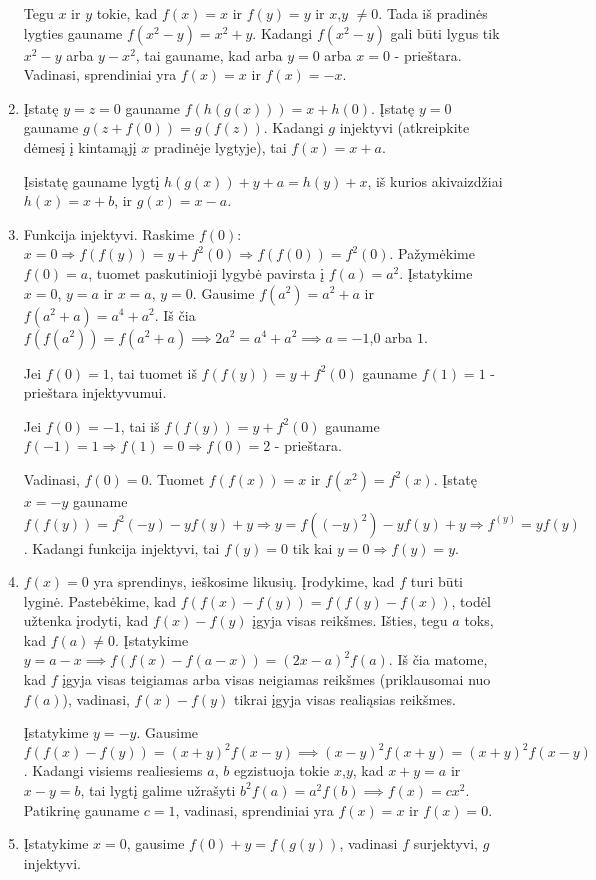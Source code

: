 \begin{enumerate}
Tegu $x$ ir $y$ tokie, kad $f(x)=x$ ir $f(y)=y$ ir $x$,$y$ $\neq 0$.
Tada iš pradinės lygties gauname $f(x^2 - y) = x^2 + y$. Kadangi
$f(x^2 - y)$ gali būti lygus tik $x^2 -y$ arba $y-x^2$, tai gauname,
kad arba $y=0$ arba $x=0$ - prieštara. Vadinasi, sprendiniai yra
$f(x)=x$ ir $f(x)=-x$.
\item 
Įstatę $y=z=0$ gauname $f(h(g(x)))=x+h(0)$. Įstatę $y=0$ gauname
$g(z+f(0))=g(f(z))$. Kadangi $g$ injektyvi (atkreipkite dėmesį į
kintamąjį $x$ pradinėje lygtyje), tai $f(x)=x+a$.

Įsistatę gauname lygtį $h(g(x)) + y + a = h(y) + x$, iš kurios
akivaizdžiai $h(x)=x+b$, ir $g(x)=x-a$.
\item 
Funkcija injektyvi. Raskime $f(0)$: $x=0 \Rightarrow f(f(y))=y +
f^2(0) \Rightarrow f(f(0))=f^2(0)$. Pažymėkime $f(0)=a$, tuomet
paskutinioji lygybė pavirsta į $f(a)=a^2$. Įstatykime $x=0$, $y=a$ ir
$x=a$, $y=0$. Gausime $f(a^2)=a^2+a$ ir $f(a^2+a)=a^4+a^2$. Iš čia
$f(f(a^2))=f(a^2+a)\implies 2a^2 = a^4 + a^2 \implies a=-1$,$0$
arba $1$.

Jei $f(0)=1$, tai tuomet iš $f(f(y))=y + f^2(0)$ gauname $f(1)=1$ -
prieštara injektyvumui.

Jei $f(0)=-1$, tai iš $f(f(y))=y + f^2(0)$ gauname $f(-1)=1
\Rightarrow f(1)=0 \Rightarrow f(0)=2$ - prieštara.

Vadinasi, $f(0)=0$. Tuomet $f(f(x))=x$ ir $f(x^2)=f^2(x)$. Įstatę
$x=-y$ gauname $f(f(y))=f^2(-y) -yf(y) + y \Rightarrow y = f((-y)^2) -
yf(y) + y\Rightarrow f^(y)=yf(y)$. Kadangi funkcija injektyvi, tai
$f(y)=0$ tik kai $y=0 \Rightarrow f(y)=y$.
\item 
$f(x)=0$ yra sprendinys, ieškosime likusių. Įrodykime, kad $f$ turi
būti lyginė. Pastebėkime, kad $f(f(x)-f(y))=f(f(y)-f(x))$, todėl
užtenka įrodyti, kad $f(x)-f(y)$ įgyja visas reikšmes. Išties, tegu
$a$ toks, kad $f(a)\neq 0$. Įstatykime $y= a-x \implies
f(f(x)-f(a-x))=(2x-a)^2f(a)$. Iš čia matome, kad $f$ įgyja visas
teigiamas arba visas neigiamas reikšmes (priklausomai nuo $f(a)$),
vadinasi, $f(x)-f(y)$ tikrai įgyja visas realiąsias reikšmes.

Įstatykime $y=-y$. Gausime $f(f(x)-f(y))=(x+y)^2f(x-y) \implies
(x-y)^2f(x+y)=(x+y)^2f(x-y)$. Kadangi visiems realiesiems $a$, $b$
egzistuoja tokie $x$,$y$, kad $x+y=a$ ir $x-y=b$, tai lygtį galime
užrašyti $b^2f(a)=a^2f(b) \implies f(x)=cx^2$. Patikrinę gauname
$c=1$, vadinasi, sprendiniai yra $f(x)=x$ ir $f(x)=0$.
\item 
Įstatykime $x = 0$, gausime $f(0)+y=f(g(y))$, vadinasi $f$ surjektyvi,
$g$ injektyvi.


\end{enumerate}
